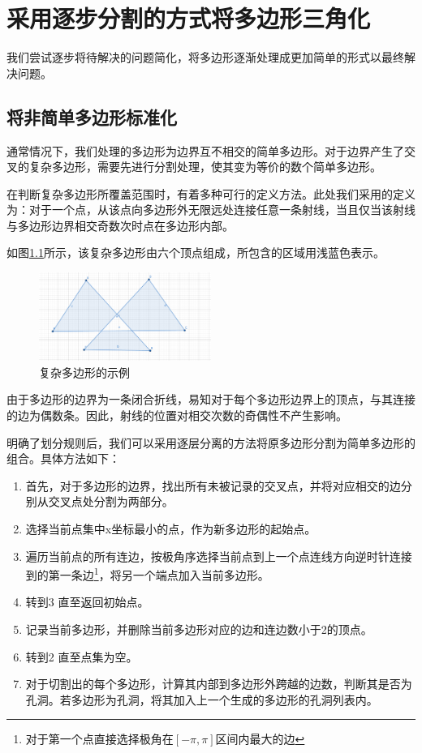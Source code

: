 \chapter{采用逐步分割的方式将多边形三角化}

我们尝试逐步将待解决的问题简化，将多边形逐渐处理成更加简单的形式以最终解决问题。
\section{将非简单多边形标准化}
通常情况下，我们处理的多边形为边界互不相交的简单多边形。对于边界产生了交叉的复杂多边形，需要先进行分割处理，使其变为等价的数个简单多边形。

在判断复杂多边形所覆盖范围时，有着多种可行的定义方法。此处我们采用的定义为：对于一个点，从该点向多边形外无限远处连接任意一条射线，当且仅当该射线与多边形边界相交奇数次时点在多边形内部。

如图\ref*{complex}所示，该复杂多边形由六个顶点组成，所包含的区域用浅蓝色表示。

\begin{figure}[htp]
    \centering
    \includegraphics[width=0.5\textwidth]
    {figures/complex.png}
    \caption{复杂多边形的示例}
    \label{complex}
  \end{figure}

由于多边形的边界为一条闭合折线，易知对于每个多边形边界上的顶点，与其连接的边为偶数条。因此，射线的位置对相交次数的奇偶性不产生影响。

明确了划分规则后，我们可以采用逐层分离的方法将原多边形分割为简单多边形的组合。具体方法如下：

\begin{enumerate}
    \item 首先，对于多边形的边界，找出所有未被记录的交叉点，并将对应相交的边分别从交叉点处分割为两部分。
    \item 选择当前点集中x坐标最小的点，作为新多边形的起始点。
    \item 遍历当前点的所有连边，按极角序选择当前点到上一个点连线方向逆时针连接到的第一条边\footnote{对于第一个点直接选择极角在\([-\pi,\pi]\)区间内最大的边}，将另一个端点加入当前多边形。
    \item 转到3 直至返回初始点。
    \item 记录当前多边形，并删除当前多边形对应的边和连边数小于2的顶点。
    \item 转到2 直至点集为空。
    \item 对于切割出的每个多边形，计算其内部到多边形外跨越的边数，判断其是否为孔洞。若多边形为孔洞，将其加入上一个生成的多边形的孔洞列表内。
\end{enumerate}

